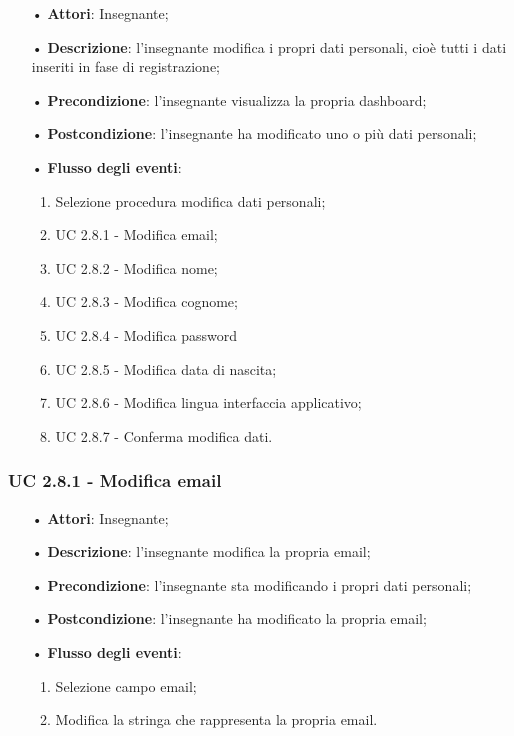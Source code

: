 \begin{itemize}
	\item[•] \textbf{Attori}: Insegnante;
	\item[•] \textbf{Descrizione}: l'insegnante modifica i propri dati personali, cioè tutti i dati inseriti in fase di registrazione;
	\item[•] \textbf{Precondizione}: l'insegnante visualizza la propria dashboard;
	\item[•] \textbf{Postcondizione}: l'insegnante ha modificato uno o più dati personali;
	\item[•] \textbf{Flusso degli eventi}:
	\begin{enumerate}
		\item Selezione procedura modifica dati personali;
		\item UC 2.8.1 - Modifica email;
		\item UC 2.8.2 - Modifica nome;
		\item UC 2.8.3 - Modifica cognome;
		\item UC 2.8.4 - Modifica password
		\item UC 2.8.5 - Modifica data di nascita;
		\item UC 2.8.6 - Modifica lingua interfaccia applicativo;
		\item UC 2.8.7 - Conferma modifica dati.
	\end{enumerate}
\end{itemize}

\subsubsection{UC 2.8.1 - Modifica email}
\begin{itemize}
	\item[•]\textbf{Attori}: Insegnante;
	\item[•]\textbf{Descrizione}: l'insegnante modifica la propria email;
	\item[•]\textbf{Precondizione}: l'insegnante sta modificando i propri dati personali;
	\item[•]\textbf{Postcondizione}: l'insegnante ha modificato la propria email; 
	\item[•]\textbf{Flusso degli eventi}: 
	\begin{enumerate}
		\item Selezione campo email;
		\item Modifica la stringa che rappresenta la propria email.
	\end{enumerate}
\end{itemize}

